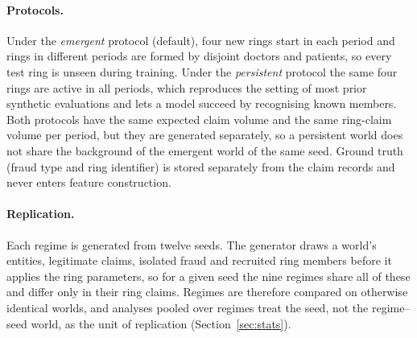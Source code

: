 \documentclass[pdflatex,sn-vancouver-num]{sn-jnl}
\begin{document}
\paragraph{Protocols.} Under the \emph{emergent} protocol (default), four new
rings start in each period and rings in different periods are formed by
disjoint doctors and patients, so every test ring is unseen during training.
Under the \emph{persistent} protocol the same four rings are active in all
periods, which reproduces the setting of most prior synthetic evaluations
and lets a model succeed by recognising known members. Both protocols have
the same expected claim volume and the same ring-claim volume per period, but
they are generated separately, so a persistent world does not share the
background of the emergent world of the same seed. Ground truth (fraud type
and ring identifier) is stored separately from the claim records and never
enters feature construction.

\paragraph{Replication.} Each regime is generated from twelve seeds. The
generator draws a world's entities, legitimate claims, isolated fraud and
recruited ring members before it applies the ring parameters, so for a given
seed the nine regimes share all of these and differ only in their ring
claims. Regimes are therefore compared on otherwise identical worlds, and
analyses pooled over regimes treat the seed, not the regime--seed world, as
the unit of replication (Section~\ref{sec:stats}).
\end{document}
